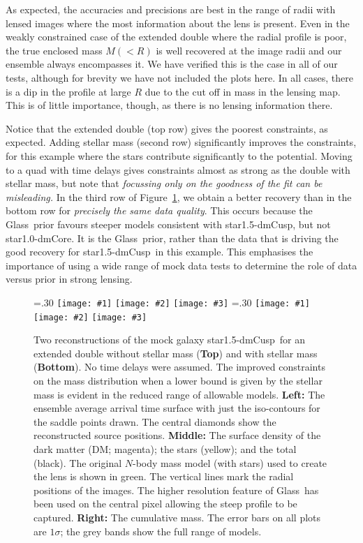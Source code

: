 \documentclass[galley,usenatbib]{mn2e}
\newcommand{\Glass}{{\sc Glass}}
\newcommand{\figref}[1] {Figure~\ref{#1}}
\newcommand{\mockAA}{{\sc star1.0-dmCore}}
\newcommand{\mockBC}{{\sc star1.5-dmCusp}}
\newcommand\plotthree[3]{{%
 \centering
 \leavevmode
 \columnwidth=.30\textwidth
 \texttt{[image: \#1]}%
 \hfil
 \texttt{[image: \#2]}%
 \hfil
 \texttt{[image: \#3]}%
}}%
\begin{document}
As expected, the accuracies and precisions are best in the range of radii with
lensed images where the most information about the lens is present. Even in the
weakly constrained case of the extended double where the radial profile is
poor, the true enclosed mass $M(<R)$ is well recovered at the image radii and
our ensemble always encompasses it. We have verified this is the case in all of
our tests, although for brevity we have not included the plots here. In all
cases, there is a dip in the profile at large $R$ due to the cut off in mass in
the lensing map. This is of little importance, though, as there is no lensing
information there. 

Notice that the extended double (top row) gives the poorest constraints, as
expected. Adding stellar mass (second row) significantly improves the
constraints, for this example where the stars contribute significantly to the
potential. Moving to a quad with time delays gives constraints almost as strong
as the double with stellar mass, but note that {\it focussing only on the
goodness of the fit can be misleading.} In the third row of
\figref{reconstruction}, we obtain a better recovery than in the bottom row for
{\it precisely the same data quality}. This occurs because the \Glass\ prior
favours steeper models consistent with \mockBC, but not \mockAA. It is the
\Glass\ prior, rather than the data that is driving the good recovery for
\mockBC\ in this example. This emphasises the importance of using a wide range
of mock data tests to determine the role of data versus prior in strong
lensing.

\begin{figure}
  \plotthree{BCExtendedDoubleR1_tms-a.pdf} {BCExtendedDoubleR1_tms-b.pdf} {BCExtendedDoubleR1_tms-c.pdf}
  \plotthree{BCExtendedDoubleR1_tmS-a-1.pdf} {BCExtendedDoubleR1_tmS-b-1.pdf} {BCExtendedDoubleR1_tmS-c-1.pdf}
\caption{
    Two reconstructions of the mock galaxy \mockBC\ for an extended
    double without stellar mass (\textbf{Top}) and with stellar mass
    (\textbf{Bottom}).  No time delays were assumed.  The improved constraints
    on the mass distribution when a lower bound is given by the stellar mass is
    evident in the reduced range of allowable models.  
\textbf{Left:}
The ensemble average arrival time surface with just the iso-contours for the
saddle points drawn. The central diamonds show the reconstructed source
positions.
\textbf{Middle:}
The surface density of the dark matter (DM; magenta); the stars (yellow); and the total (black).
The original $N$-body mass model (with stars) used to create the lens is shown in green.
The vertical lines mark the radial positions of the images. The higher
resolution feature of \Glass\ has been used on the central pixel allowing the
steep profile to be captured.
\textbf{Right:}
The cumulative mass. The error bars on all plots are $1\sigma$; the grey bands show the full range of models.}
\label{reconstruction}
\end{figure}
\end{document}
